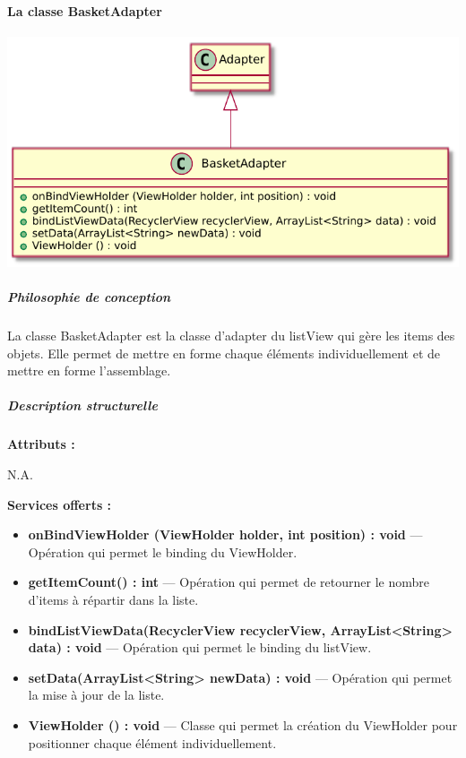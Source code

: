 \paragraph{La classe BasketAdapter}

\begin{minipage}
    {\linewidth}
    \centering
    \includegraphics[width=0.80\linewidth]{../schemas/Conception_detaillee/classe_basketAdapter.pdf}
\end{minipage}

\subparagraph{Philosophie de conception \newline} 

\medspace

La classe BasketAdapter est la classe d'adapter du listView qui gère les items des objets. Elle permet de mettre en forme chaque éléments individuellement et de mettre en forme l'assemblage.

\subparagraph{Description structurelle \newline}

\medspace

\textbf{Attributs :}

N.A.

\textbf{Services offerts :}

\begin{itemize}
    \item \textbf{onBindViewHolder (ViewHolder holder, int position) : void} --- Opération qui permet le binding du ViewHolder. 
    \item \textbf{getItemCount() : int} --- Opération qui permet de retourner le nombre d'items à répartir dans la liste. 
    \item \textbf{bindListViewData(RecyclerView recyclerView, ArrayList<String> data) : void} --- Opération qui permet le binding du listView.
    \item \textbf{setData(ArrayList<String> newData) : void} --- Opération qui permet la mise à jour de la liste.
    \item \textbf{ViewHolder () : void} --- Classe qui permet la création du ViewHolder pour positionner chaque élément individuellement.


\end{itemize}
